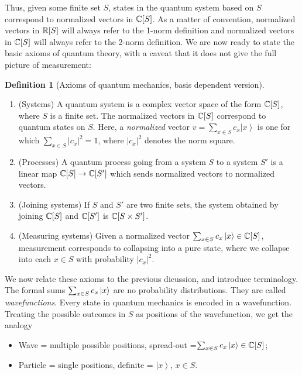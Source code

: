 \documentclass{article}
\theoremstyle{definition}
\newtheorem*{definition}{Definition}
\numberwithin{figure}{section}
\begin{document}
Thus, given some finite set $S$, states in the quantum system based on $S$ correspond to normalized vectors in $\mathbb{C}[S]$. As a matter of convention, normalized vectors in $\mathbb{R}[S]$ will always refer to the 1-norm definition and normalized vectors in $\mathbb{C}[S]$ will always refer to the 2-norm definition. We are now ready to state the basic axioms of quantum theory, with a caveat that it does not give the full picture of measurement:

\begin{definition}[Axioms of quantum mechanics, basis dependent version] $\,$

\begin{enumerate}
\item (Systems) A quantum system is a complex vector space of the form $\mathbb{C}[S]$, where $S$ is a finite set. The normalized vectors in $\mathbb{C}[S]$ correspond to quantum states on $S$. Here, a \textit{normalized} vector $v=\sum_{x\in S}c_x\left|x\right>$ is one for which $\sum_{x\in S}|c_x|^2=1$, where $|c_x|^2$ denotes the norm square.
\item (Processes) A quantum process going from a system $S$ to a system $S'$ is a linear map $\mathbb{C}[S]\to \mathbb{C}[S']$ which sends normalized vectors to normalized vectors.
\item (Joining systems) If $S$ and $S'$ are two finite sets, the system obtained by joining $\mathbb{C}[S]$ and $\mathbb{C}[S']$ is $\mathbb{C}[S\times S']$.
\item (Measuring systems) Given a normalized vector $\sum_{x\in S}c_x \left |x\right>\in \mathbb{C}[S]$, measurement corresponds to collapsing into a pure state, where we collapse into each $x\in S$ with probability $|c_x|^2$.
\end{enumerate}

\raggedleft\qedsymbol{}
\end{definition}

We now relate these axioms to the previous dicussion, and introduce terminology. The formal sums $\sum_{x\in S}c_x\ket{x}$ are no probability distributions. They are called \textit{wavefunctions}. Every state in quantum mechanics is encoded in a wavefunction. Treating the possible outcomes in $S$ as positions of the wavefunction, we get the analogy

\begin{itemize}
\item Wave = multiple possible positions, spread-out =$\sum_{x\in S}c_x\ket{x}\in \mathbb{C}[S]$;
\item Particle = single positions, definite = $\left|x\right>$, $x\in S$.
\end{itemize}
\end{document}
